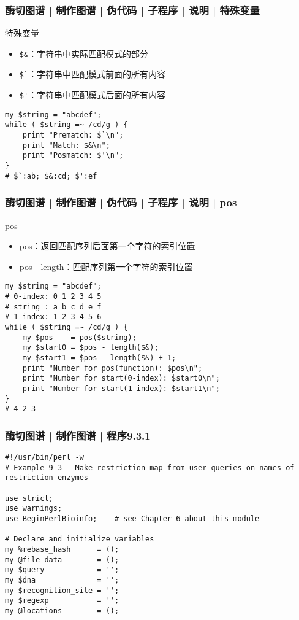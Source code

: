 \begin{frame}[fragile]
  \frametitle{酶切图谱 | 制作图谱 | 伪代码 | 子程序 | 说明 | \alert{特殊变量}}
  \begin{block}{特殊变量}
    \begin{itemize}
      \item \verb|$&|：字符串中实际匹配模式的部分
      \item \verb|$`|：字符串中匹配模式前面的所有内容
      \item \verb|$'|：字符串中匹配模式后面的所有内容
    \end{itemize}
  \end{block}
  \pause
  \vspace{-1.5em}
\begin{lstlisting}
my $string = "abcdef";
while ( $string =~ /cd/g ) {
    print "Prematch: $`\n";
    print "Match: $&\n";
    print "Posmatch: $'\n";
}
# $`:ab; $&:cd; $':ef
\end{lstlisting}
\end{frame}

\begin{frame}[fragile]
  \frametitle{酶切图谱 | 制作图谱 | 伪代码 | 子程序 | 说明 | \alert{pos}}
  \begin{block}{pos}
    \begin{itemize}
      \item pos：返回匹配序列后面第一个字符的索引位置
      \item pos - length：匹配序列第一个字符的索引位置
    \end{itemize}
  \end{block}
  \pause
  \vspace{-2em}
\begin{lstlisting}[basicstyle=\small\tt,numberstyle=\footnotesize]
my $string = "abcdef";
# 0-index: 0 1 2 3 4 5
# string : a b c d e f
# 1-index: 1 2 3 4 5 6
while ( $string =~ /cd/g ) {
    my $pos    = pos($string);
    my $start0 = $pos - length($&);
    my $start1 = $pos - length($&) + 1;
    print "Number for pos(function): $pos\n";
    print "Number for start(0-index): $start0\n";
    print "Number for start(1-index): $start1\n";
}
# 4 2 3
\end{lstlisting}
\end{frame}

\begin{frame}[fragile]
  \frametitle{酶切图谱 | 制作图谱 | 程序9.3.1}
  \vspace{-1.5em}
\begin{lstlisting}[firstnumber=1,basicstyle=\small\tt,numberstyle=\footnotesize]
#!/usr/bin/perl -w
# Example 9-3   Make restriction map from user queries on names of restriction enzymes

use strict;
use warnings;
use BeginPerlBioinfo;    # see Chapter 6 about this module

# Declare and initialize variables
my %rebase_hash      = ();
my @file_data        = ();
my $query            = '';
my $dna              = '';
my $recognition_site = '';
my $regexp           = '';
my @locations        = ();
\end{lstlisting}
\end{frame}

